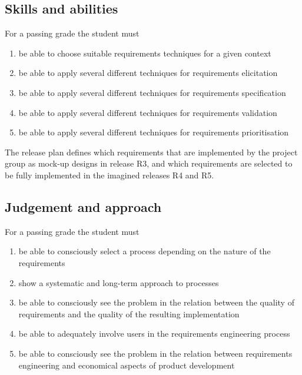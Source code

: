\subsection{Skills and abilities}
For a passing grade the student must
\begin{enumerate}[noitemsep]
\item be able to choose suitable requirements techniques for a given context
\item     be able to apply several different techniques for requirements elicitation
\item     be able to apply several different techniques for requirements specification
\item     be able to apply several different techniques for requirements validation
\item     be able to apply several different techniques for requirements prioritisation
\end{enumerate}
\ifteknolog
  The release plan defines which requirements that are implemented by the project group as mock-up designs in release R3, and which requirements are selected to be fully implemented in the imagined releases R4 and R5. 
 \fi
\subsection{Judgement and approach}
For a passing grade the student must
\begin{enumerate}[noitemsep]
\item     be able to consciously select a process depending on the nature of the requirements
\item     show a systematic and long-term approach to processes
\item     be able to consciously see the problem in the relation between the quality of requirements and the quality of the resulting implementation
\item     be able to adequately involve users in the requirements engineering process
\ifteknolog
	\item     be able to consciously see the problem in the relation between requirements engineering and economical aspects of product development
\fi
\end{enumerate}


